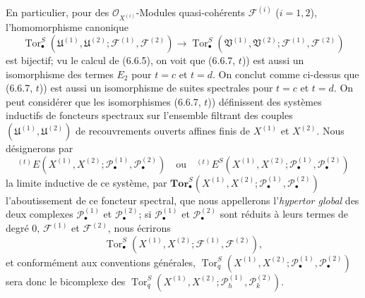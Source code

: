 \begin{env}[6.6.7]
En particulier, pour des $\mathscr O_{X^{(i)}}$-Modules quasi-cohérents
$\mathscr F^{(i)}$ ($i=1,2$), l'homomorphisme canonique
\[
  \operatorname{Tor}_\bullet^S
  (\mathfrak U^{(1)},\mathfrak U^{(2)};
   \mathscr F^{(1)},\mathscr F^{(2)})
  \longrightarrow
  \operatorname{Tor}_\bullet^S
  (\mathfrak V^{(1)},\mathfrak V^{(2)};
   \mathscr F^{(1)},\mathscr F^{(2)})
\]
est bijectif; vu le calcul de (6.6.5), on voit que (6.6.7, $t$)) est aussi un
isomorphisme des termes $E_2$ pour $t=c$ et $t=d$. On conclut comme ci-dessus
que (6.6.7, $t$)) est aussi un isomorphisme de suites spectrales pour $t=c$ et
$t=d$.
On peut considérer que les isomorphismes (6.6.7, $t$)) définissent des systèmes
inductifs de foncteurs spectraux sur l'ensemble filtrant des couples
$(\mathfrak U^{(1)},\mathfrak U^{(2)})$ de recouvrements ouverts affines finis
de $X^{(1)}$ et $X^{(2)}$. Nous désignerons par
\[
  {}^{(t)}E
  (X^{(1)},X^{(2)};
   \mathscr P_\bullet^{(1)},\mathscr P_\bullet^{(2)})
  \quad\text{ou}\quad
  {}^{(t)}E^S
  (X^{(1)},X^{(2)};
   \mathscr P_\bullet^{(1)},\mathscr P_\bullet^{(2)})
\]
la limite inductive de ce système, par
$\mathbf{Tor}_\bullet^S
(X^{(1)},X^{(2)};\mathscr P_\bullet^{(1)},\mathscr P_\bullet^{(2)})$
l'aboutissement de ce foncteur spectral, que nous appellerons l'\emph{hypertor
global} des deux complexes $\mathscr P_\bullet^{(1)}$ et
$\mathscr P_\bullet^{(2)}$; si $\mathscr P_\bullet^{(1)}$ et
$\mathscr P_\bullet^{(2)}$ sont réduits à leurs termes de degré 0,
$\mathscr F^{(1)}$ et $\mathscr F^{(2)}$, nous écrirons
\[
  \operatorname{Tor}_\bullet^S
  (X^{(1)},X^{(2)};\mathscr F^{(1)},\mathscr F^{(2)}),
\]
et conformément aux conventions générales,
$
  \operatorname{Tor}_q^S
  (X^{(1)},X^{(2)};\mathscr P_\bullet^{(1)},\mathscr P_\bullet^{(2)})
$
sera donc le bicomplexe des
$
  \operatorname{Tor}_q^S
  (X^{(1)},X^{(2)};\mathscr P_h^{(1)},\mathscr P_k^{(2)})$.
\end{env}

